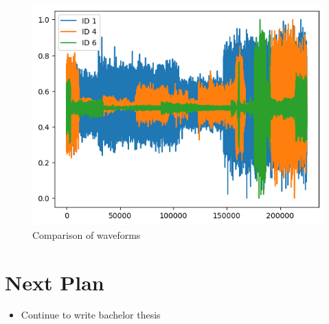 \documentclass[dvipdfmx]{article}
\begin{document}
\begin{figure}[H]
\begin{center}
\includegraphics[width=\linewidth]{./img/wave_comparison.png}
\end{center}
\caption{Comparison of waveforms}
\end{figure}

\section{Next Plan}
\begin{itemize}
    \item Continue to write bachelor thesis
\end{itemize}
\end{document}
